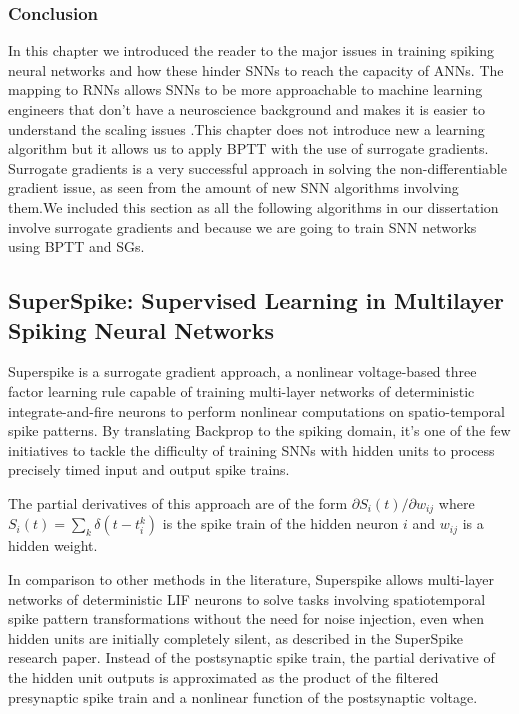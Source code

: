 \documentclass[12pt]{report}
\begin{document}
\subsubsection{Conclusion}
In this chapter we introduced the reader to the major issues in training spiking neural networks and how these hinder SNNs to reach the capacity of ANNs. The mapping to RNNs allows SNNs to be more approachable to machine learning engineers that don't have a neuroscience background and makes it is easier to understand the scaling issues .This chapter does not introduce new a learning algorithm but it allows us to apply BPTT with the use of surrogate gradients. Surrogate gradients is a very successful approach in solving the non-differentiable gradient issue, as seen from the amount of new SNN algorithms involving them.We included this section as all the following algorithms in our dissertation involve surrogate gradients and because we are going to train SNN networks using BPTT and SGs.
\subsection{SuperSpike: Supervised Learning in Multilayer Spiking Neural Networks}
Superspike is a surrogate gradient approach, a nonlinear voltage-based three
factor learning rule capable of training multi-layer networks of deterministic integrate-and-fire neurons to perform nonlinear computations on spatio-temporal spike patterns. By translating Backprop to the spiking domain, it's  one of the few initiatives to tackle the difficulty of training SNNs with hidden units to process precisely timed input and output spike trains.

The partial derivatives of this approach are of the form $\partial S_{i}(t) / \partial w_{i j}$ where $S_{i}(t)=\sum_{k} \delta\left(t-t_{i}^{k}\right)$ is the spike train of the hidden neuron $i$ and $w_{i j}$ is a hidden weight.

In comparison to other methods in the literature, Superspike allows multi-layer networks of deterministic LIF neurons to solve tasks involving spatiotemporal spike pattern transformations without the need for noise injection, even when hidden units are initially completely silent, as described in the SuperSpike research paper. Instead of the postsynaptic spike train, the partial derivative of the hidden unit outputs is approximated as the product of the filtered presynaptic spike train and a nonlinear function of the postsynaptic voltage.
\end{document}
